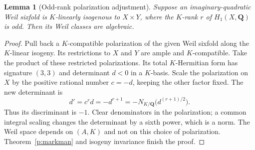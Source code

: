 \documentclass[10pt,reqno]{article}
\theoremstyle{emphasizedplain}
\theoremstyle{emphasizeddefinition}
\theoremstyle{emphasizeddefinition}
\newtheorem{prelemma}{Lemma}
\newcommand{\Q}{\mathbf Q}
\begin{document}
\begin{prelemma}[Odd-rank polarization adjustment]
\label{p:oddscale}
Suppose an imaginary-quadratic Weil sixfold is $K$-linearly isogenous to
$X\times Y$, where the $K$-rank $r$ of $H_1(X,\Q)$ is odd.
Then its Weil classes are algebraic.
\end{prelemma}
\begin{proof}
Pull back a $K$-compatible polarization of the given Weil sixfold
along the $K$-linear isogeny. Its restrictions to $X$ and $Y$ are ample
and $K$-compatible. Take the product of these restricted polarizations. Its total $K$-Hermitian form has
signature $(3,3)$ and determinant $d<0$ in a $K$-basis. Scale the
polarization on $X$ by the positive rational number $c=-d$, keeping the
other factor fixed. The new determinant is
\[
 d'=c^r d=-d^{r+1}
     =-N_{K/\Q}\bigl(d^{(r+1)/2}\bigr).
\]
Thus its discriminant is $-1$. Clear denominators in the polarization;
a common integral scaling changes the determinant by a sixth power,
which is a norm. The Weil space depends on $(A,K)$ and not on this choice
of polarization. Theorem~\ref{p:markman} and isogeny invariance finish
the proof.
\end{proof}
\end{document}
